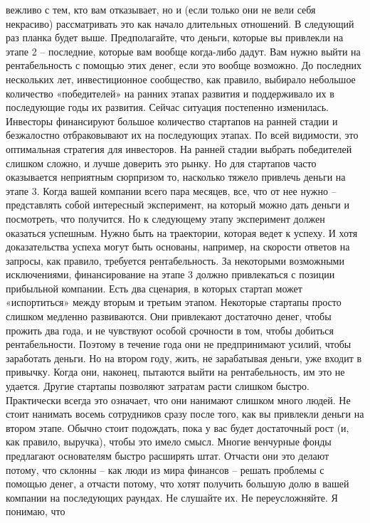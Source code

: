\documentclass[ebook,12pt,oneside,openany]{memoir}
\begin{document}
вежливо с тем, кто вам отказывает, но и (если только они не вели себя
некрасиво) рассматривать это как начало длительных отношений. В
следующий раз планка будет выше. Предполагайте, что деньги, которые вы
привлекли на этапе 2 – последние, которые вам вообще когда-либо дадут.
Вам нужно выйти на рентабельность с помощью этих денег, если это
вообще возможно. До последних нескольких лет, инвестиционное
сообщество, как правило, выбирало небольшое количество «победителей»
на ранних этапах развития и поддерживало их в последующие годы их
развития. Сейчас ситуация постепенно изменилась. Инвесторы финансируют
большое количество стартапов на ранней стадии и безжалостно
отбраковывают их на последующих этапах. По всей видимости, это
оптимальная стратегия для инвесторов. На ранней стадии выбрать
победителей слишком сложно, и лучше доверить это рынку. Но для
стартапов часто оказывается неприятным сюрпризом то, насколько тяжело
привлечь деньги на этапе 3. Когда вашей компании всего пара месяцев,
все, что от нее нужно – представлять собой интересный эксперимент, на
который можно дать деньги и посмотреть, что получится. Но к следующему
этапу эксперимент должен оказаться успешным. Нужно быть на траектории,
которая ведет к успеху. И хотя доказательства успеха могут быть
основаны, например, на скорости ответов на запросы, как правило,
требуется рентабельность. За некоторыми возможными исключениями,
финансирование на этапе 3 должно привлекаться с позиции прибыльной
компании. Есть два сценария, в которых стартап может «испортиться»
между вторым и третьим этапом. Некоторые стартапы просто слишком
медленно развиваются. Они привлекают достаточно денег, чтобы прожить
два года, и не чувствуют особой срочности в том, чтобы добиться
рентабельности. Поэтому в течение года они не предпринимают усилий,
чтобы заработать деньги. Но на втором году, жить, не зарабатывая
деньги, уже входит в привычку. Когда они, наконец, пытаются выйти на
рентабельность, им это не удается. Другие стартапы позволяют затратам
расти слишком быстро. Практически всегда это означает, что они
нанимают слишком много людей. Не стоит нанимать восемь сотрудников
сразу после того, как вы привлекли деньги на втором этапе. Обычно
стоит подождать, пока у вас будет достаточный рост (и, как правило,
выручка), чтобы это имело смысл. Многие венчурные фонды предлагают
основателям быстро расширять штат. Отчасти они это делают потому, что
склонны – как люди из мира финансов – решать проблемы с помощью денег,
а отчасти потому, что хотят получить большую долю в вашей компании на
последующих раундах. Не слушайте их. Не переусложняйте. Я понимаю, что
\end{document}
